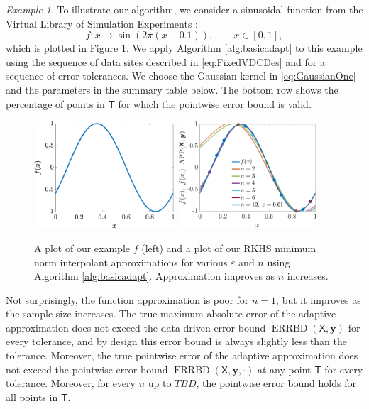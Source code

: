 \documentclass[]{mcom-l}
\theoremstyle{theorem}
\theoremstyle{remark}
\newtheorem{example}{Example}
\DeclareMathOperator{\errBd}{ERRBD}
\newcommand{\mT}{\mathsf{T}}
\newcommand{\mX}{\mathsf{X}}
\newcommand{\by}{{\boldsymbol{y}}}
\begin{document}
\begin{example}
	\label{ex:adpsamplesize}
	To illustrate our algorithm, we consider a sinusoidal function \cite{CurEtal88b} from the Virtual Library of Simulation Experiments \cite{VirLib17a}:
	\begin{equation}
	f: x \mapsto  \sin(2\pi(x-0.1)), \qquad x \in [0,1],
	\end{equation}
	which is plotted in Figure \ref{fig:ex1}.  We apply Algorithm \ref{alg:basicadapt} to this example using the sequence of data sites described in \eqref{eq:FixedVDCDes} and for a sequence of error tolerances.  We choose the Gaussian kernel in \eqref{eq:GaussianOne} and the parameters in the summary table below.  The bottom row shows the percentage of points in $\mT$ for which the pointwise error bound is valid.
	
	
	
	\begin{figure}[H]
		\centering
		\includegraphics[height = 4cm]{ProgramsImages/sinFunPlot.eps} \qquad
		\includegraphics[height = 4cm]{ProgramsImages/AdaptAlgo1_sinFun_GaussKernel_adapt_th_EmpBayesAx_theta_1.eps}
		\caption{A plot of our example $f$ (left) and a plot of our RKHS minimum norm interpolant approximations for various $\varepsilon$ and  $n$ using Algorithm \ref{alg:basicadapt}.  Approximation improves as $n$ increases. \label{fig:ex1}}
	\end{figure}
	
Not surprisingly, the function approximation is poor for $n=1$, but it improves as the sample size increases.  The true  maximum absolute error of the adaptive approximation does not exceed the data-driven error bound $\errBd(\mX,\by)$ for every tolerance, and by design this error bound is always slightly less than the tolerance.  Moreover, the true pointwise error of the adaptive approximation does not exceed the pointwise error bound $\errBd(\mX,\by,\cdot)$ at any point $\mT$ for every tolerance.  Moreover, for every $n$ up to $TBD$, the pointwise error bound holds for all points in  $\mT$.
	
\end{example} 
\end{document}
